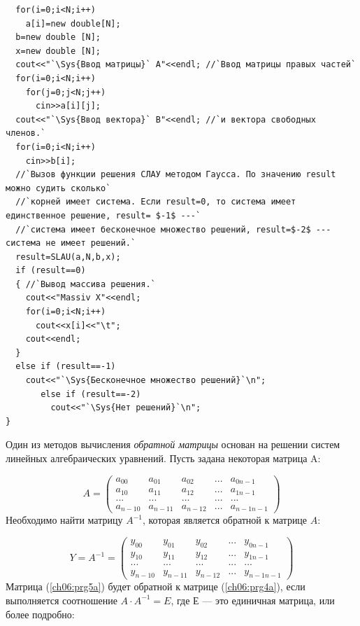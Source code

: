 \begin{lstlisting}
  for(i=0;i<N;i++)
    a[i]=new double[N];
  b=new double [N];
  x=new double [N];
  cout<<"`\Sys{Ввод матрицы}` A"<<endl; //`Ввод матрицы правых частей`
  for(i=0;i<N;i++)
    for(j=0;j<N;j++)
      cin>>a[i][j];
  cout<<"`\Sys{Ввод вектора}` B"<<endl; //`и вектора свободных членов.`
  for(i=0;i<N;i++)
    cin>>b[i];
  //`Вызов функции решения СЛАУ методом Гаусса. По значению result можно судить сколько` 
  //`корней имеет система. Если result=0, то система имеет единственное решение, result= $-1$ ---`
  //`система имеет бесконечное множество решений, result=$-2$ --- система не имеет решений.`
  result=SLAU(a,N,b,x);
  if (result==0)
  { //`Вывод массива решения.`
    cout<<"Massiv X"<<endl;
    for(i=0;i<N;i++)
      cout<<x[i]<<"\t";
    cout<<endl;
  }
  else if (result==-1)
    cout<<"`\Sys{Бесконечное множество решений}`\n";
       else if (result==-2)
         cout<<"`\Sys{Нет решений}`\n";
}
\end{lstlisting}


Один из методов вычисления \emph{обратной матрицы} основан на решении
систем линейных алгебраических уравнений. Пусть задана некоторая матрица A:

\begin{equation}\label{ch06:prg4a}
A=\left(\begin{matrix}a_{00}&a_{01}&a_{02}&...&a_{0n-1}\\a_{10}&a_{11}&a_{12}&...&a_{1n-1}\\...&...&...&...&...\\a_{n-10}&a_{n-11}&a_{n-12}&...&a_{n-1n-1}\end{matrix}\right)
\end{equation}
Необходимо найти матрицу $A^{-1}$, которая является обратной к матрице $A$:

\begin{equation}\label{ch06:prg5a}
Y=A^{-1}=\left(\begin{matrix}y_{00}&y_{01}&y_{02}&...&y_{0n-1}\\y_{10}&y_{11}&y_{12}&...&y_{1n-1}\\...&...&...&...&...\\y_{n-10}&y_{n-11}&y_{n-12}&...&y_{n-1n-1}\end{matrix}\right)
\end{equation}
Матрица (\ref{ch06:prg5a}) будет обратной к матрице (\ref{ch06:prg4a}), если выполняется соотношение $A\cdot A^{-1}=E$,
где Е --- это единичная матрица, или более подробно:

